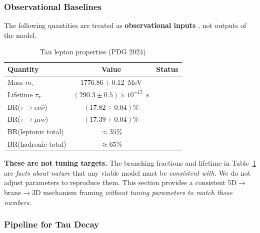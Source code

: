
\subsubsection{Observational Baselines}

The following quantities are treated as \textbf{observational inputs}
\tagBL{}, not outputs of the model.

\begin{table}[htbp]
\centering
\caption{Tau lepton properties (PDG 2024) \tagBL{}}
\label{tab:tau-baselines}
\begin{tabular}{lcc}
\toprule
\textbf{Quantity} & \textbf{Value} & \textbf{Status} \\
\midrule
Mass $m_\tau$ & $1776.86 \pm 0.12$~MeV & \tagBL{} \\
Lifetime $\tau_\tau$ & $(290.3 \pm 0.5) \times 10^{-15}$~s & \tagBL{} \\
BR($\tau \to e\nu\bar{\nu}$) & $(17.82 \pm 0.04)\%$ & \tagBL{} \\
BR($\tau \to \mu\nu\bar{\nu}$) & $(17.39 \pm 0.04)\%$ & \tagBL{} \\
BR(leptonic total) & $\approx 35\%$ & \tagBL{} \\
BR(hadronic total) & $\approx 65\%$ & \tagBL{} \\
\bottomrule
\end{tabular}
\end{table}

\begin{tcolorbox}[edcGuardrail, title=\textbf{Epistemic Guardrail: No Fitting}]
\textbf{These are not tuning targets.} The branching fractions and lifetime
in Table~\ref{tab:tau-baselines} are \emph{facts about nature} that any viable
model must be \emph{consistent with}. We do not adjust parameters to
reproduce them. This section provides a consistent 5D$\to$brane$\to$3D mechanism
framing \emph{without tuning parameters to match those numbers}.
\end{tcolorbox}


\subsubsection{Pipeline for Tau Decay}

